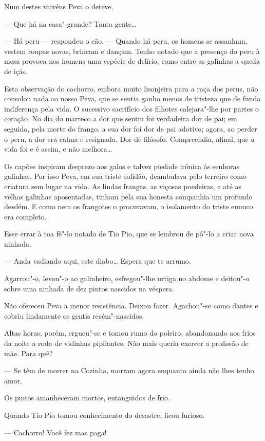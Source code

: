 Num destes vaivéns Peva o deteve.

--- Que há na casa"-grande? Tanta gente\ldots{}

--- Há peru --- respondeu o cão. --- Quando há peru, os homens se
assanham, vestem roupas novas, brincam e dançam. Tenho notado que a
presença do peru à mesa provoca nos homens uma espécie de delírio, como
entre as galinhas a queda de içás.

Esta observação do cachorro, embora muito lisonjeira para a raça dos
perus, não consolou nada ao nosso Peva, que se sentia ganho menos de
tristeza que de funda indiferença pela vida. O sucessivo sacrifício dos
filhotes calejara"-lhe por partes o coração. No dia do marreco a dor que
sentiu foi verdadeira dor de pai; em seguida, pela morte do frango, a
sua dor foi dor de pai adotivo; agora, ao perder o peru, a dor era calma
e resignada. Dor de filósofo. Compreendia, afinal, que a vida foi e é
assim, e não melhora\ldots{}

Os capões inspiram desprezo aos galos e talvez piedade irônica às
senhoras galinhas. Por isso Peva, em sua triste solidão, deambulava pelo
terreiro como criatura sem lugar na vida. As lindas frangas, as viçosas
poedeiras, e até as velhas galinhas aposentadas, tinham pela sua honesta
companhia um profundo desdém. E como nem os frangotes o procuravam, o
isolamento do triste eunuco era completo.

Esse errar à toa fê"-lo notado de Tio Pio, que se lembrou de pô"-lo a
criar nova ninhada.

--- Anda vadiando aqui, este diabo\ldots{} Espera que te arrumo.

Agarrou"-o, levou"-o ao galinheiro, esfregou"-lhe urtiga no abdome e
deitou"-o sobre uma ninhada de dez pintos nascidos na véspera.

Não ofereceu Peva a menor resistência. Deixou fazer. Agachou"-se como
dantes e cobriu lindamente os gentis recém"-nascidos.

Altas horas, porém, ergueu"-se e tomou rumo do poleiro, abandonando aos
frios da noite a roda de vidinhas pipilantes. Não mais queria exercer a
profissão de mãe. Para quê?

--- Se têm de morrer na Cozinha, morram agora enquanto ainda não lhes
tenho amor.

Os pintos amanheceram mortos, entanguidos de frio.

Quando Tio Pio tomou conhecimento do desastre, ficou furioso.

--- Cachorro! Você fez mas paga!

